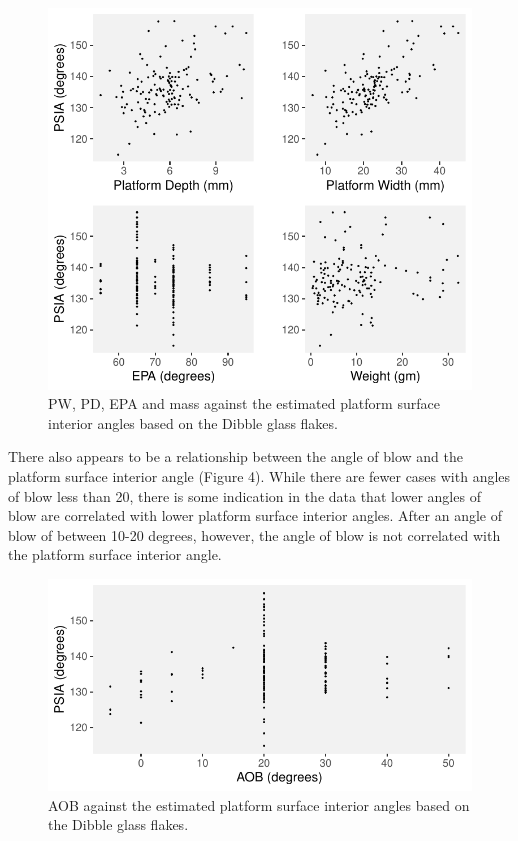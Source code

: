 \documentclass[10pt,letterpaper]{article}
\begin{document}
\begin{figure}
\centering
\includegraphics{PSIA_Manuscript_files/figure-latex/fig3-angles_to_other_measures-1.pdf}
\caption{PW, PD, EPA and mass against the estimated platform surface
interior angles based on the Dibble glass flakes.}
\end{figure}

There also appears to be a relationship between the angle of blow and
the platform surface interior angle (Figure 4). While there are fewer
cases with angles of blow less than 20, there is some indication in the
data that lower angles of blow are correlated with lower platform
surface interior angles. After an angle of blow of between 10-20
degrees, however, the angle of blow is not correlated with the platform
surface interior angle.

\begin{figure}
\centering
\includegraphics{PSIA_Manuscript_files/figure-latex/fig4-AOB_to_PSIA-1.pdf}
\caption{AOB against the estimated platform surface interior angles
based on the Dibble glass flakes.}
\end{figure}
\end{document}
